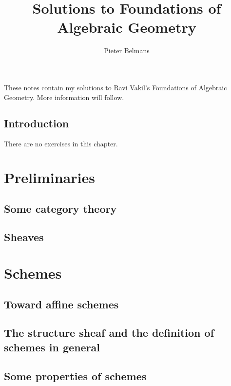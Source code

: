 \documentclass[oneside, openany]{memoir}
\title{Solutions to Foundations of Algebraic Geometry}
\author{Pieter Belmans}
\begin{document}
\maketitle

These notes contain my solutions to Ravi Vakil's Foundations of Algebraic Geometry. More information will follow.

\tableofcontents*


\chapter{Introduction}
There are no exercises in this chapter.


\part{Preliminaries}

\chapter{Some category theory}


\chapter{Sheaves}



\part{Schemes}

\chapter{Toward affine schemes}


\chapter{The structure sheaf and the definition of schemes in general}


\chapter{Some properties of schemes}

\end{document}

